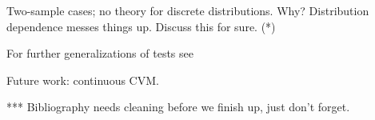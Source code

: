 \documentclass[article]{jss}
\begin{document}
Two-sample cases; no theory for discrete distributions. Why? Distribution dependence messes things up. Discuss this for sure. (*)

For further generalizations of tests see \cite{dewev1973}

Future work: continuous CVM.


*** Bibliography needs cleaning before we finish up, just don't forget.


%

\end{document}
